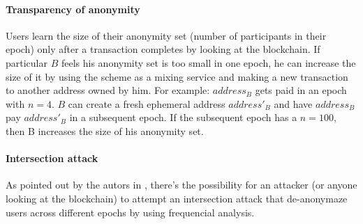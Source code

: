 \paragraph{Transparency of anonymity} Users learn the size of their anonymity
set (number of participants in their epoch) only after a transaction completes
by looking at the blockchain. If particular $B$ feels his anonymity set is too
small in one epoch, he can increase the size of it by using the scheme as  a
mixing service and making a new transaction to another address owned by him. For
example:  $address_B$ gets paid in an epoch with $n = 4$. $B$ can create a fresh
ephemeral address $address'_B$ and have $address_B$ pay $address'_B$ in a
subsequent epoch. If the subsequent epoch has a $n = 100$, then B increases the
size of his anonymity set.

\paragraph{Intersection attack} As pointed out by the autors in
\cite{heilman-blindly-signed-contracts}, there's the possibility for an attacker
(or anyone looking at the blockchain) to attempt an intersection attack that
de-anonymaze users across different epochs by using frequencial analysis.

